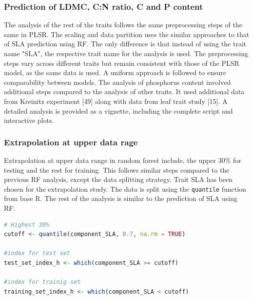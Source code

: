 \documentclass[12pt,a4paper]{report}
\begin{document}
\subsubsection*{Prediction of LDMC, C:N ratio, C and P content}
The analysis of the rest of the traits follows the same preprocessing steps of the same in PLSR. The scaling and data partition uses the similar approaches to that of SLA prediction using RF. The only difference is that instead of using the trait name "SLA", the respective trait name for the analysis is used. The preprocessing steps vary across different traits but remain consistent with those of the PLSR model, as the same data is used. A uniform approach is followed to ensure comparability between models. The analysis of phosphorus content involved additional steps compared to the analysis of other traits. It used additional data from Kreinitz experiment [49] along with data from leaf trait study [15]. A detailed analysis is provided as a vignette, including the complete script and interactive plots. \\

\subsubsection*{Extrapolation at upper data rage}
Extrapolation at upper data range in random forest include, the upper $30\%$ for testing and the rest for training. This follows similar steps compared to the previous RF analysis, except the data splitting strategy. Trait SLA has been chosen for the extrapolation study. The data is split using the \texttt{quantile} function from base R. The rest of the analysis is similar to the prediction of SLA using RF.\\

\begin{lstlisting}[language=R, style=mystyle]
# Highest 30%
cutoff <- quantile(component_SLA, 0.7, na.rm = TRUE)

#index for test set
test_set_index_h <- which(component_SLA >= cutoff)

#index for trainig set
training_set_index_h <- which(component_SLA < cutoff)
\end{lstlisting}
\end{document}
